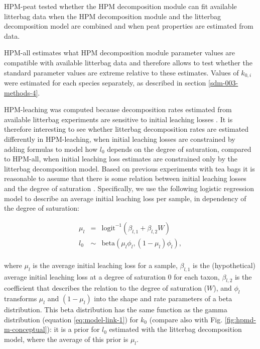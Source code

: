\documentclass[esd, manuscript]{copernicus}
\begin{document}
HPM-peat tested whether the HPM decomposition module can fit available litterbag data when the HPM decomposition module and the litterbag decomposition model are combined and when peat properties are estimated from data.

HPM-all estimates what HPM decomposition module parameter values are compatible with available litterbag data and therefore allows to test whether the standard parameter values are extreme relative to these estimates. Values of \(k_{0,i}\) were estimated for each species separately, as described in section \ref{sdm-003-methods-4}.

HPM-leaching was computed because decomposition rates estimated from available litterbag experiments are sensitive to initial leaching losses \citep{Yu.2001, Lind.2022, Teickner.2025}. It is therefore interesting to see whether litterbag decomposition rates are estimated differently in HPM-leaching, when initial leaching losses are constrained by adding formulas to model how \(l_0\) depends on the degree of saturation, compared to HPM-all, when initial leaching loss estimates are constrained only by the litterbag decomposition model. Based on previous experiments with tea bags it is reasonable to assume that there is some relation between initial leaching losses and the degree of saturation \citep{Lind.2022}. Specifically, we use the following logistic regression model to describe an average initial leaching loss per sample, in dependency of the degree of saturation:

\begin{equation}
\begin{aligned}
\mu_{l} & = & \text{logit}^{-1}(\beta_{l,1} + \beta_{l,2} W)\\
l_0 & \sim & \text{beta}(\mu_{l}\phi_l, (1 - \mu_{l})\phi_l),\\
\end{aligned}
\label{eq:hpm-hpm-l-2}
\end{equation}

where \(\mu_{l}\) is the average initial leaching loss for a sample, \(\beta_{l,1}\) is the (hypothetical) average initial leaching loss at a degree of saturation 0 for each taxon, \(\beta_{l,2}\) is the coefficient that describes the relation to the degree of saturation (\(W\)), and \(\phi_l\) transforms \(\mu_{l}\) and \((1 - \mu_{l})\) into the shape and rate parameters of a beta distribution. This beta distribution has the same function as the gamma distribution (equation \eqref{eq:model-link-1}) for \(k_0\) (compare also with Fig. \ref{fig:hpmd-m-conceptual}): it is a prior for \(l_0\) estimated with the litterbag decomposition model, where the average of this prior is \(\mu_{l}\).
\end{document}
